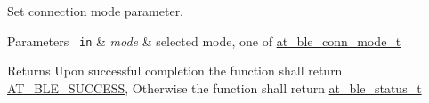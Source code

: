 Set connection mode parameter. 


\begin{DoxyParams}[1]{Parameters}
\mbox{\texttt{ in}}  & {\em mode} & selected mode, one of \mbox{\hyperlink{at__ble__api_8h_a53f9993d9d4520af74f601a867e1d379}{at\+\_\+ble\+\_\+conn\+\_\+mode\+\_\+t}}\\
\hline
\end{DoxyParams}
\begin{DoxyReturn}{Returns}
Upon successful completion the function shall return \mbox{\hyperlink{group__error__codes__group_gga3b1db9b95feb157b3c188ca27fe76988a7e3bfff5387331cd4f2c56cbcbbd7e19}{A\+T\+\_\+\+B\+L\+E\+\_\+\+S\+U\+C\+C\+E\+SS}}, Otherwise the function shall return \mbox{\hyperlink{at__ble__api_8h_ace24eb4e5ca3f325c663b809da5feb92}{at\+\_\+ble\+\_\+status\+\_\+t}} 
\end{DoxyReturn}
